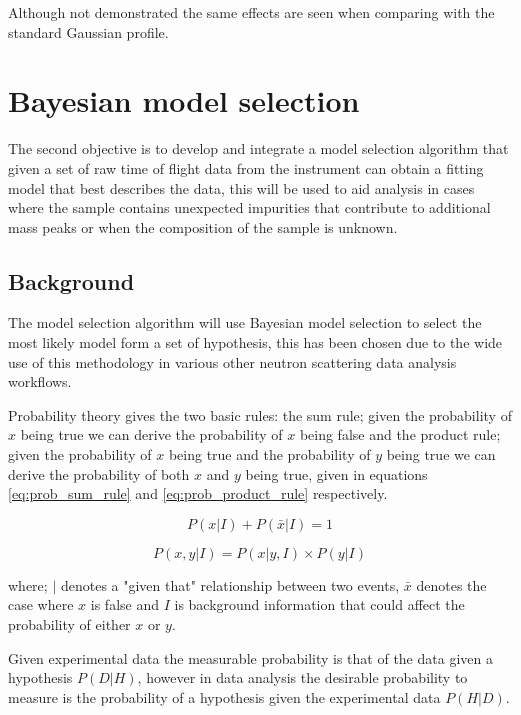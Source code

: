 \documentclass[a4paper]{article}
\begin{document}
Although not demonstrated the same effects are seen when comparing with the
standard Gaussian profile.

\section{Bayesian model selection}
\label{sec:bayesian_analysis_routines}

The second objective is to develop and integrate a model selection algorithm
that given a set of raw time of flight data from the instrument can obtain a
fitting model that best describes the data, this will be used to aid analysis in
cases where the sample contains unexpected impurities that contribute to
additional mass peaks or when the composition of the sample is unknown.

\subsection{Background}
\label{sec:bayes_background}

The model selection algorithm will use Bayesian model selection to select the
most likely model form a set of hypothesis, this has been chosen due to the wide
use of this methodology in various other neutron scattering data analysis
workflows.

Probability theory gives the two basic rules: the sum rule; given the
probability of $x$ being true we can derive the probability of $x$ being false
and the product rule; given the probability of $x$ being true and the
probability of $y$ being true we can derive the probability of both $x$ and $y$
being true, given in equations \ref{eq:prob_sum_rule} and
\ref{eq:prob_product_rule} respectively.

\begin{equation}
  \label{eq:prob_sum_rule}
  P(x | I) + P(\bar{x} | I) = 1
\end{equation}

\begin{equation}
  \label{eq:prob_product_rule}
  P(x, y | I) = P(x | y, I) \times P(y | I)
\end{equation}

where; $|$ denotes a "given that" relationship between two events, $\bar{x}$
denotes the case where $x$ is false and $I$ is background information that could
affect the probability of either $x$ or $y$.

Given experimental data the measurable probability is that of the data given a
hypothesis $P(D|H)$, however in data analysis the desirable probability to
measure is the probability of a hypothesis given the experimental data $P(H|D)$.
\end{document}
